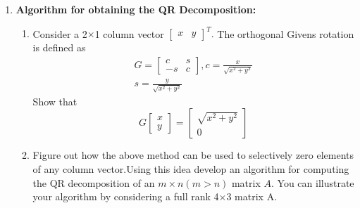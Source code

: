 \documentclass[journal,12pt,twocolumn]{IEEEtran}
\begin{document}
\begin{enumerate}
\item \textbf{Algorithm for obtaining the QR Decomposition:}
\begin{enumerate}
\item Consider a 2$\times$1 column vector 
$\begin{bmatrix}
x & y \end{bmatrix}^T.$
The orthogonal Givens rotation is defined as
\begin{align*}
G=\begin{bmatrix}c&s\\-s&c\end{bmatrix},
c=\frac{x}{\sqrt{x^2+y^2}}\\s=\frac{y}{\sqrt{x^2+y^2}}
\end{align*}
Show that
\begin{equation}
G\begin{bmatrix}x\\y\end{bmatrix}=\begin{bmatrix}
\sqrt{x^2+y^2}\\0\end{bmatrix}
\end{equation}
\item Figure out how the above method can be used to selectively zero elements of any column vector.Using this idea develop an algorithm for computing the QR decomposition of an $m\times n (m > n)$ matrix $A$. You can illustrate your algorithm by considering a full rank 4$\times$3 matrix A.
\end{enumerate}
\end{enumerate}
\end{document}
